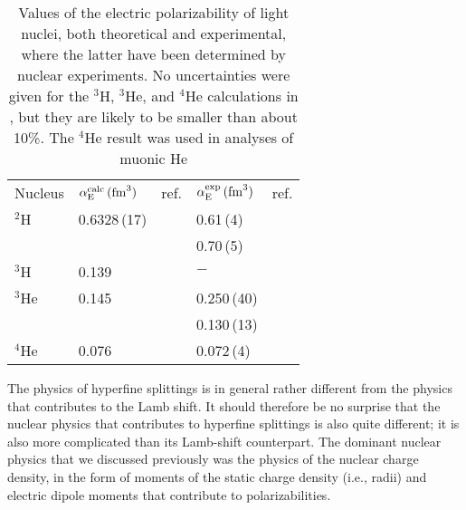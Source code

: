 \documentclass{svmult}
\begin{document}
\begin{table}[ht]
\centering
\caption{Values of the electric polarizability of light nuclei, both theoretical
and experimental, where the latter have been determined by nuclear experiments.
No uncertainties were given for the $^3$H, $^3$He, and $^4$He calculations in
\cite{3pol,4pol}, but they are likely to be smaller than about 10\%. The 
$^4$He result was used in analyses of muonic He\protect\cite{He4-x,He4-t}}
\begin{tabular}{l l l l l}
\hline \noalign{\smallskip}
Nucleus \hspace{0.2in}
& $\alpha_{\rm E}^{\rm calc}\, ({\rm fm}^3)$ \hspace{0.2in}
&ref. \hspace{0.2in}
&$\alpha_{\rm E}^{\rm exp}\, ({\rm fm}^3)$ \hspace{0.2in}
&ref. \\ \noalign{\smallskip} \hline
$^2$H  &0.6328\,(17)&\cite{d-pol}  & 0.61\,(4)   &\cite{d-pol-g} \\ 
       &            &              & 0.70\,(5)   &\cite{d-pol-x} \\ \hline
$^3$H  & 0.139      &\cite{3pol}   &\mbox{$-$}   & \rule{0in}{2.5ex} \\ \hline
$^3$He & 0.145      &\cite{4pol}   & 0.250\,(40) &\cite{he3-pol}\\
       &            &              & 0.130\,(13) &\cite{rinker} \\ 
\hline
$^4$He & 0.076      &\cite{4pol}   & 0.072\,(4)  &\cite{He4-x}
\rule{0in}{2.5ex}\\ \hline 
\end{tabular}
\end{table}

The physics of hyperfine splittings is in general rather different from the
physics that contributes to the Lamb shift. It should therefore be no surprise
that the nuclear physics that contributes to hyperfine splittings is also
quite different; it is also more complicated than its Lamb-shift counterpart.
The dominant nuclear physics that we discussed previously was the physics of the
nuclear charge density, in the form of moments of
the static charge density (i.e., radii) and electric dipole moments that
contribute to polarizabilities.
\end{document}
